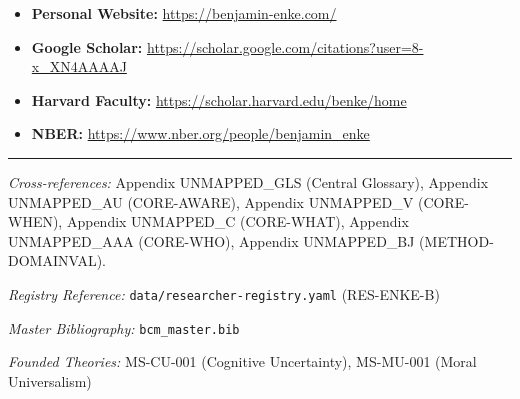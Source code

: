\begin{itemize}[nosep]
    \item \textbf{Personal Website:} \url{https://benjamin-enke.com/}
    \item \textbf{Google Scholar:} \url{https://scholar.google.com/citations?user=8-x_XN4AAAAJ}
    \item \textbf{Harvard Faculty:} \url{https://scholar.harvard.edu/benke/home}
    \item \textbf{NBER:} \url{https://www.nber.org/people/benjamin_enke}
\end{itemize}



\vspace{1em}
\hrule
\vspace{0.5em}

\noindent\textit{Cross-references:}
Appendix UNMAPPED_GLS (Central Glossary),
Appendix UNMAPPED_AU (CORE-AWARE),
Appendix UNMAPPED_V (CORE-WHEN),
Appendix UNMAPPED_C (CORE-WHAT),
Appendix UNMAPPED_AAA (CORE-WHO),
Appendix UNMAPPED_BJ (METHOD-DOMAINVAL).

\noindent\textit{Registry Reference:} \texttt{data/researcher-registry.yaml} (RES-ENKE-B)

\noindent\textit{Master Bibliography:} \texttt{bcm\_master.bib}

\noindent\textit{Founded Theories:} MS-CU-001 (Cognitive Uncertainty), MS-MU-001 (Moral Universalism)

